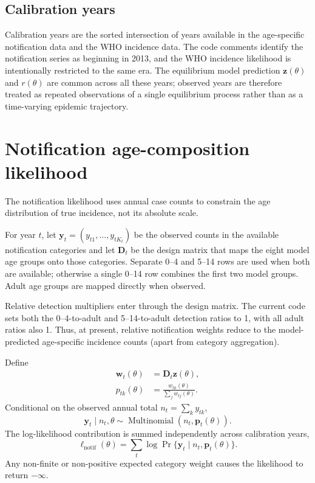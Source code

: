 \documentclass[11pt]{article}
\begin{document}
\subsection{Calibration years}

Calibration years are the sorted intersection of years available in the age-specific notification data and the WHO incidence data. The code comments identify the notification series as beginning in 2013, and the WHO incidence likelihood is intentionally restricted to the same era. The equilibrium model prediction $\mathbf z(\theta)$ and $r(\theta)$ are common across all these years; observed years are therefore treated as repeated observations of a single equilibrium process rather than as a time-varying epidemic trajectory.

\section{Notification age-composition likelihood}

The notification likelihood uses annual case counts to constrain the age distribution of true incidence, not its absolute scale.

For year $t$, let $\mathbf y_t=(y_{t1},\ldots,y_{tK_t})$ be the observed counts in the available notification categories and let $\mathbf D_t$ be the design matrix that maps the eight model age groups onto those categories. Separate 0--4 and 5--14 rows are used when both are available; otherwise a single 0--14 row combines the first two model groups. Adult age groups are mapped directly when observed.

Relative detection multipliers enter through the design matrix. The current code sets both the 0--4-to-adult and 5--14-to-adult detection ratios to 1, with all adult ratios also 1. Thus, at present, relative notification weights reduce to the model-predicted age-specific incidence counts (apart from category aggregation).

Define
\begin{align}
\mathbf w_t(\theta)&=\mathbf D_t\mathbf z(\theta),\\
p_{tk}(\theta)&=\frac{w_{tk}(\theta)}{\sum_jw_{tj}(\theta)}.
\end{align}
Conditional on the observed annual total $n_t=\sum_ky_{tk}$,
\begin{equation}
\mathbf y_t\mid n_t,\theta\sim\operatorname{Multinomial}\left(n_t,\mathbf p_t(\theta)\right).
\label{eq:notiflike}
\end{equation}
The log-likelihood contribution is summed independently across calibration years,
\begin{equation}
\ell_{\mathrm{notif}}(\theta)=\sum_t\log \Pr\{\mathbf y_t\mid n_t,\mathbf p_t(\theta)\}.
\end{equation}
Any non-finite or non-positive expected category weight causes the likelihood to return $-\infty$.
\end{document}
